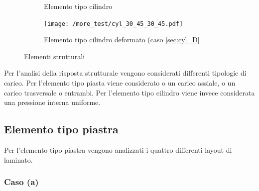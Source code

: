 \documentclass[a4paper,num-refs]{oup-contemporary}
\begin{document}
\begin{figure}[bt!]
\begin{subfigure}[t]{0.24\textwidth}
\caption{Elemento tipo cilindro}
		\label{fig:three sin x}
	\end{subfigure}
	\hfill
	\begin{subfigure}[t]{0.24\textwidth}
	\centering
 \texttt{[image: /more\_test/cyl\_30\_45\_30\_45.pdf]}
	\caption{Elemento tipo cilindro deformato (caso \cref{sec:cyl_D}}
	\label{fig:five ove x}
\end{subfigure}
	\hfill
	\caption{Elementi strutturali}
	\label{fig:three graphs}
\end{figure}

Per l'analisi della risposta strutturale vengono considerati differenti tipologie di carico. Per l'elemento tipo piasta viene considerato o un carico assiale, o un carico trasversale o entrambi. Per l'elemento tipo cilindro viene invece considerata una pressione interna uniforme.

\subsection{Elemento tipo piastra}

Per l'elemento tipo piastra vengono analizzati i quattro differenti layout di laminato.

\subsubsection{Caso (a)}
\label{sec:plate_A}
\end{document}
